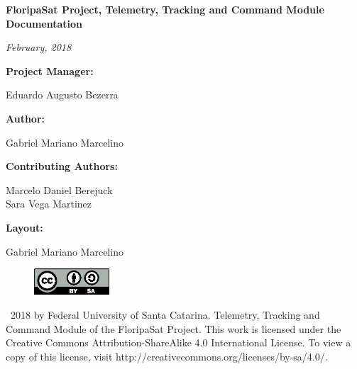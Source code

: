 \documentclass[12pt]{book}
\begin{document}
\thispagestyle{empty}

\begin{center}

\textbf{FloripaSat Project, Telemetry, Tracking and Command Module Documentation}

\textit{February, 2018}

\vspace{1cm}

\textbf{Project Manager:}

Eduardo Augusto Bezerra

\vspace{1cm}

\textbf{Author:}

Gabriel Mariano Marcelino

\vspace{1cm}

\textbf{Contributing Authors:}

Marcelo Daniel Berejuck \\
Sara Vega Martinez \\

\vspace{1cm}

\textbf{Layout:}

Gabriel Mariano Marcelino

\end{center}

\vspace{8cm}

\begin{figure}[!h]
	\begin{center}
		\includegraphics[width=0.25\textwidth]{figures/by-sa.eps}
	\end{center}
\end{figure}

\textcopyright\  2018 by Federal University of Santa Catarina. Telemetry, Tracking and Command Module of the FloripaSat Project. This work is licensed under the Creative Commons Attribution-ShareAlike 4.0 International License. To view a copy of this license, visit http://creativecommons.org/licenses/by-sa/4.0/.

\end{document}
